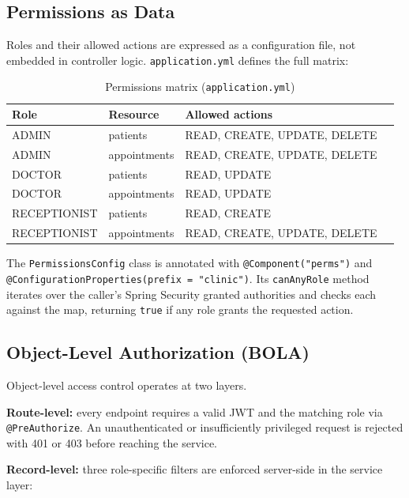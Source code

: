 \documentclass[12pt,a4paper]{report}
\begin{document}
\subsection{Permissions as Data}

Roles and their allowed actions are expressed as a configuration file, not embedded in
controller logic. \texttt{application.yml} defines the full matrix:

\begin{table}[H]
\centering\small
\caption{Permissions matrix (\texttt{application.yml})}
\begin{tabular}{llll}
\toprule
\textbf{Role}  & \textbf{Resource}    & \textbf{Allowed actions} \\
\midrule
ADMIN          & patients             & READ, CREATE, UPDATE, DELETE \\
ADMIN          & appointments         & READ, CREATE, UPDATE, DELETE \\
DOCTOR         & patients             & READ, UPDATE \\
DOCTOR         & appointments         & READ, UPDATE \\
RECEPTIONIST   & patients             & READ, CREATE \\
RECEPTIONIST   & appointments         & READ, CREATE, UPDATE, DELETE \\
\bottomrule
\end{tabular}
\end{table}

The \texttt{PermissionsConfig} class is annotated with \texttt{@Component("perms")} and
\texttt{@ConfigurationProperties(prefix = "clinic")}. Its \texttt{canAnyRole} method
iterates over the caller's Spring Security granted authorities and checks each against
the map, returning \texttt{true} if any role grants the requested action.

\subsection{Object-Level Authorization (BOLA)}

Object-level access control operates at two layers.

\textbf{Route-level:} every endpoint requires a valid JWT and the matching role via
\texttt{@PreAuthorize}. An unauthenticated or insufficiently privileged request is
rejected with 401 or 403 before reaching the service.

\textbf{Record-level:} three role-specific filters are enforced server-side in the service layer:
\end{document}
